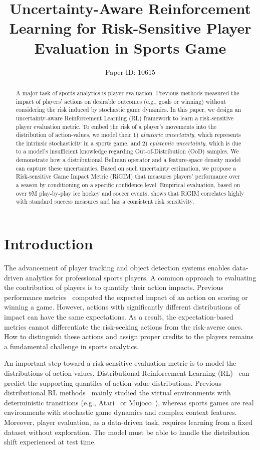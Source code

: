 \documentclass[letterpaper]{article} %
\title{Uncertainty-Aware Reinforcement Learning for Risk-Sensitive Player Evaluation in Sports Game}
\author{Paper ID: 10615}
\begin{document}
\maketitle

\begin{abstract}
A major task of sports analytics is player evaluation. Previous methods measured the impact of players' actions on desirable outcomes (e.g., goals or winning) without considering the risk induced by stochastic game dynamics.  In this paper, we design an uncertainty-aware Reinforcement Learning (RL) framework to learn a risk-sensitive player evaluation metric. To embed the risk of a player’s movements into the distribution of action-values, we model their 1) {\it aleatoric uncertainty}, which represents the intrinsic stochasticity in a sports game, and 2) {\it epistemic uncertainty}, which is due to a model's insufficient knowledge regarding Out-of-Distribution (OoD) samples. We demonstrate how a distributional Bellman operator and a feature-space density model can capture these uncertainties. Based on such uncertainty estimation, we propose a Risk-sensitive Game Impact Metric (RiGIM) that measures players' performance over a season by conditioning on a specific confidence level. Empirical evaluation, based on over 9M play-by-play ice hockey and soccer events, shows that RiGIM correlates highly with standard success measures and has a consistent risk sensitivity.
\end{abstract}
\section{Introduction}
The advancement of player tracking and object detection systems enables data-driven analytics for professional sports players. A common approach to evaluating the contribution of players is to quantify their action impacts.  Previous performance metrics~\cite{Liu2018DRL,Decroos2019Actions,Luo2020IRL} computed the expected impact of an action on scoring or winning a game. However, actions with significantly different distributions of impact can have the same expectations. As a result, the expectation-based metrics cannot differentiate the risk-seeking actions from the risk-averse ones. How to distinguish these actions and assign proper credits to the players remains a fundamental challenge in sports analytics.

An important step toward a risk-sensitive evaluation metric is to model the distributions of action values. Distributional Reinforcement Learning (RL)~\cite{bdr2022} can predict the supporting quantiles of action-value distributions. Previous distributional RL methods~\cite{bellemare2017distributional,Dabney2018DistributionalRL,Mavrin2019DistributionalRL,Zhou2020NonCrossing,Zhou2021Quantile} mainly studied the virtual environments with deterministic transitions (e.g., Atari~\cite{bellemare2013arcade} or Mujoco~\cite{Todorov2012Mujoco}), whereas sports games are real environments with stochastic game dynamics and complex context features. Moreover, player evaluation, as a data-driven task, requires learning from a fixed dataset without exploration. The model must be able to handle the distribution shift experienced at test time.
\end{document}
